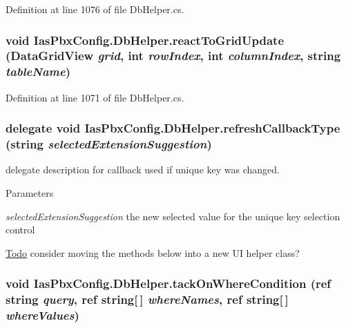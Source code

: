 Definition at line 1076 of file DbHelper.cs.\hypertarget{class_ias_pbx_config_1_1_db_helper_a12c26ddcef05d832dccb1643da9d6ba7}{
\subsubsection[{reactToGridUpdate}]{\setlength{\rightskip}{0pt plus 5cm}void IasPbxConfig.DbHelper.reactToGridUpdate (DataGridView {\em grid}, \/  int {\em rowIndex}, \/  int {\em columnIndex}, \/  string {\em tableName})}}
\label{class_ias_pbx_config_1_1_db_helper_a12c26ddcef05d832dccb1643da9d6ba7}


Definition at line 1071 of file DbHelper.cs.\hypertarget{class_ias_pbx_config_1_1_db_helper_a9553dce2157909e881ef96ea9370ab41}{
\subsubsection[{refreshCallbackType}]{\setlength{\rightskip}{0pt plus 5cm}delegate void IasPbxConfig.DbHelper.refreshCallbackType (string {\em selectedExtensionSuggestion})}}
\label{class_ias_pbx_config_1_1_db_helper_a9553dce2157909e881ef96ea9370ab41}


delegate description for callback used if unique key was changed. 
\begin{DoxyParams}{Parameters}
\item[{\em selectedExtensionSuggestion}]the new selected value for the unique key selection control \end{DoxyParams}
\begin{Desc}
\item[\hyperlink{todo__todo000022}{Todo}]consider moving the methods below into a new UI helper class? \end{Desc}
\hypertarget{class_ias_pbx_config_1_1_db_helper_a0b6833e58769ca9396160a5cf189adfc}{
\subsubsection[{tackOnWhereCondition}]{\setlength{\rightskip}{0pt plus 5cm}void IasPbxConfig.DbHelper.tackOnWhereCondition (ref string {\em query}, \/  ref string\mbox{[}$\,$\mbox{]} {\em whereNames}, \/  ref string\mbox{[}$\,$\mbox{]} {\em whereValues})}}
\label{class_ias_pbx_config_1_1_db_helper_a0b6833e58769ca9396160a5cf189adfc}


